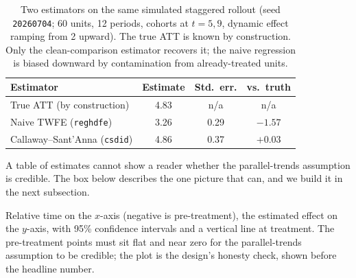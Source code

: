 \begin{table}[htbp]
\centering
\caption[TWFE vs.\ Callaway--Sant'Anna on a known truth]{Two estimators on the same simulated staggered rollout (seed \texttt{20260704}; 60 units, 12 periods, cohorts at $t{=}5,9$, dynamic effect ramping from 2 upward). The true ATT is known by construction. Only the clean-comparison estimator recovers it; the naive regression is biased downward by contamination from already-treated units.}
\label{tab:did-compare}
{\footnotesize
\begin{tabular}{lccc}
\hline
Estimator & Estimate & Std.\ err. & vs.\ truth \\
\hline
True ATT (by construction) & 4.83 & n/a & n/a \\
Naive TWFE (\texttt{reghdfe}) & 3.26 & 0.29 & $-1.57$ \\
Callaway--Sant'Anna (\texttt{csdid}) & 4.86 & 0.37 & $+0.03$ \\
\hline
\end{tabular}
}
\end{table}

A table of estimates cannot show a reader whether the parallel-trends assumption is credible. The box below describes the one picture that can, and we build it in the next subsection.

\begin{vizcallout}
Relative time on the $x$-axis (negative is pre-treatment), the estimated effect on the $y$-axis, with 95\% confidence intervals and a vertical line at treatment. The pre-treatment points must sit flat and near zero for the parallel-trends assumption to be credible; the plot is the design's honesty check, shown before the headline number.
\end{vizcallout}


